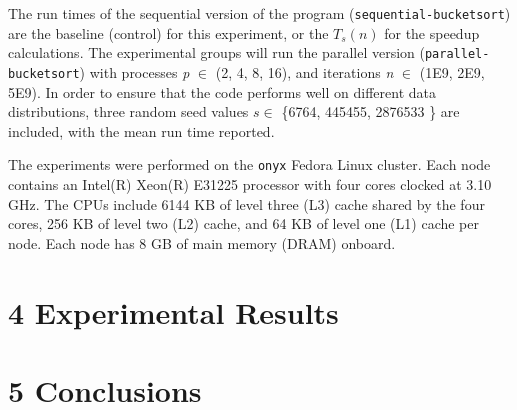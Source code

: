\documentclass{bsu-ms}
\begin{document}
The run times of the sequential version of the program (\texttt{sequential-bucketsort}) are the baseline (control) for this experiment, or the $T_s(n)$ for the speedup calculations. The experimental groups will run the parallel version (\texttt{parallel-bucketsort}) with processes \textit{p} $\in$ (2, 4, 8, 16), and iterations \textit{n} $\in$ (1E9, 2E9, 5E9). In order to ensure that the code performs well on different data distributions, three random seed values $s \in$ \{6764, 445455, 2876533 \} are included, with the mean run time reported.

The experiments were performed on the \texttt{onyx} Fedora Linux cluster. Each node  contains an Intel(R) Xeon(R) E31225 processor with four cores clocked at 3.10 GHz. The CPUs include 6144 KB of level three (L3) cache shared by the four cores, 256 KB of level two (L2) cache, and 64 KB of level one (L1) cache per node. Each node has 8 GB of main memory (DRAM) onboard.

\section*{4 Experimental Results}


\section*{5 Conclusions}
\end{document}
